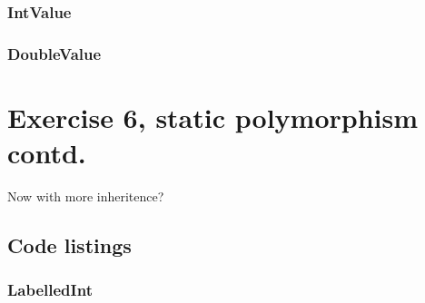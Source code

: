 \documentclass[11pt]{article}
\begin{document}
\subsubsection*{IntValue}



\subsubsection*{DoubleValue}



\section*{Exercise 6, static polymorphism contd.}
Now with more inheritence?

\subsection*{Code listings}




\subsubsection*{LabelledInt}


\end{document}
